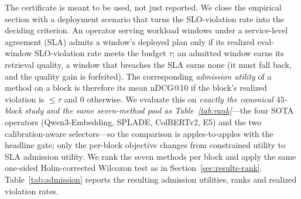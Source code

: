 The certificate is meant to be used, not just reported. We close the empirical section with a deployment scenario that turns the SLO-violation rate into the deciding criterion. An operator serving workload windows under a service-level agreement (SLA) admits a window's deployed plan only if its realized eval-window SLO-violation rate meets the budget $\tau$; an admitted window earns its retrieval quality, a window that breaches the SLA earns none (it must fall back, and the quality gain is forfeited). The corresponding \emph{admission utility} of a method on a block is therefore its mean nDCG@10 if the block's realized violation is $\le\tau$ and $0$ otherwise. We evaluate this on \emph{exactly the canonical $45$-block study and the same seven-method pool as Table~\ref{tab:rank}}---the four SOTA operators (Qwen3-Embedding, SPLADE, ColBERTv2, E5) and the two calibration-aware selectors---so the comparison is apples-to-apples with the headline gate; only the per-block objective changes from constrained utility to SLA admission utility. We rank the seven methods per block and apply the same one-sided Holm-corrected Wilcoxon test as in Section~\ref{sec:results-rank}. Table~\ref{tab:admission} reports the resulting admission utilities, ranks and realized violation rates.

\begin{table}[t]
\centering
\caption{SLA admission control on the canonical $45$-block study at a $\tau{=}10\%$ SLA, over the \emph{same} seven-method pool as Table~\ref{tab:rank}. Admission utility is mean nDCG@10 if the block's realized violation rate is $\le\tau$, else $0$; lower rank is better, ``viol'' is the mean realized violation rate. \CWC{} ranks first and Holm-beats all six baselines (one-sided Wilcoxon; Friedman $\chi^2{=}146.4$, $p{=}4.4\times10^{-29}$); no value is hand-set.}
\label{tab:admission}
\footnotesize
{}
\end{table}

